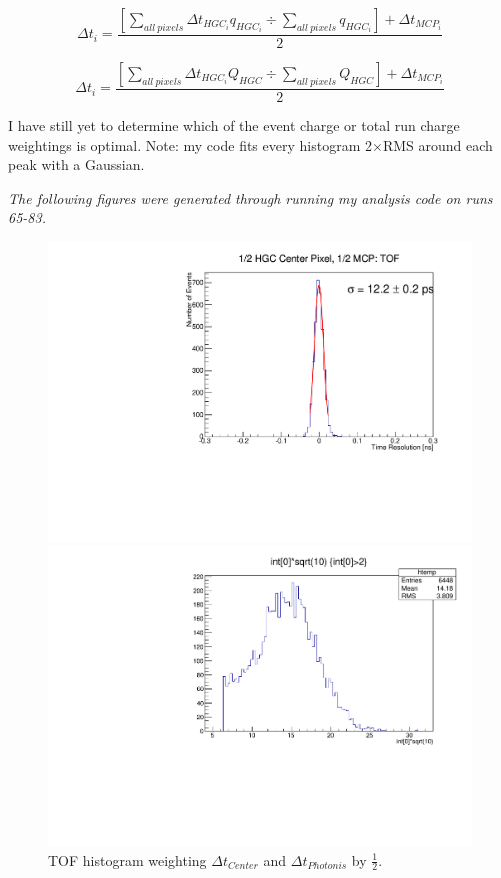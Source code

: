 \documentclass[12pt]{article}
\begin{document}
\[
\Delta t_i = 
\dfrac{
\left[ \sum\limits_{all\ pixels} \Delta t_{HGC_i} q_{HGC_i}
\div
\sum\limits_{all\ pixels} q_{HGC_i}
\right]
+ \Delta t_{MCP_i} 
} {2}
\]

\[
\Delta t_i = 
\dfrac{
\left[ \sum\limits_{all\ pixels} \Delta t_{HGC_i} Q_{HGC}
\div
\sum\limits_{all\ pixels} Q_{HGC}
\right]
+ \Delta t_{MCP_i} 
} {2}
\]

I have still yet to determine which of the event charge or total run charge weightings is optimal. 
Note: my code fits every histogram 2$\times$RMS around each peak with a Gaussian.

\textit{ The following figures were generated through running my analysis code on runs 65-83. }


\begin{figure}
\centering
\begin{minipage}[t]{.49\textwidth}
	\centering
	\includegraphics[width=\textwidth]{deltaT_Center_MCP_Equal.pdf}
	\caption{TOF histogram weighting $\Delta t_{Center}$ and $\Delta t_{Photonis}$ by $\frac{1}{2}$.}
	\label{fig:CenterMCPEqual}
\end{minipage} \hfill
\begin{minipage}[t]{.49\textwidth}
	\centering
	\includegraphics[width=\textwidth]{ChargeCut1.pdf}

\end{minipage}
\end{figure}
\end{document}
